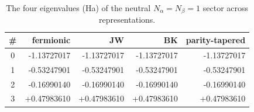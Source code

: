 \begin{table}[H]
\centering\small
\begin{tabular}{crrrr}
\toprule
\# & fermionic & JW & BK & parity-tapered \\
\midrule
0 & -1.13727017 & -1.13727017 & -1.13727017 & -1.13727017 \\
1 & -0.53247901 & -0.53247901 & -0.53247901 & -0.53247901 \\
2 & -0.16990140 & -0.16990140 & -0.16990140 & -0.16990140 \\
3 & +0.47983610 & +0.47983610 & +0.47983610 & +0.47983610 \\
\bottomrule
\end{tabular}
\caption{The four eigenvalues (Ha) of the neutral $N_\alpha{=}N_\beta{=}1$ sector across representations.}
\end{table}
